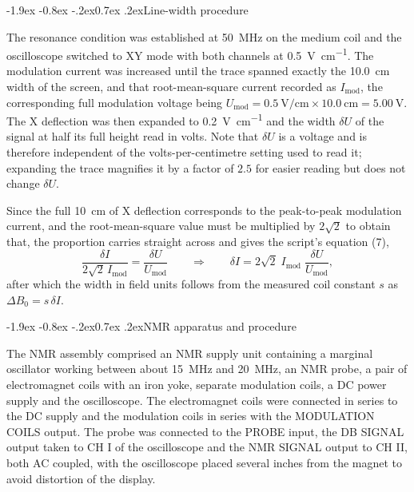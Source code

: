 \documentclass[11pt,a4paper]{article}
\makeatletter
\renewcommand\subsection{\@startsection{subsection}{2}{\z@}%
  {-1.9ex \@plus -0.8ex \@minus -.2ex}{0.7ex \@plus .2ex}{\normalfont\normalsize\bfseries}}
\makeatother
\begin{document}
\subsection{Line-width procedure}
\label{sec:width}

The resonance condition was established at \SI{50}{\mega\hertz} on the medium coil and the
oscilloscope switched to XY mode with both channels at \SI{0.5}{\volt\per\centi\metre}. The
modulation current was increased until the trace spanned exactly the \SI{10.0}{\centi\metre} width
of the screen, and that root-mean-square current recorded as $I_{\mathrm{mod}}$, the corresponding
full modulation voltage being
$U_{\mathrm{mod}} = \SI{0.5}{\volt\per\centi\metre}\times\SI{10.0}{\centi\metre} = \SI{5.00}{\volt}$.
The X deflection was then expanded to \SI{0.2}{\volt\per\centi\metre} and the width $\delta U$ of
the signal at half its full height read in volts. Note that $\delta U$ is a voltage and is
therefore independent of the volts-per-centimetre setting used to read it; expanding the trace
magnifies it by a factor of $2.5$ for easier reading but does not change $\delta U$.

Since the full \SI{10}{\centi\metre} of X deflection corresponds to the peak-to-peak modulation
current, and the root-mean-square value must be multiplied by $2\sqrt{2}$ to obtain that,
the proportion carries straight across and gives the script's equation (7),
\begin{equation}
\frac{\delta I}{2\sqrt{2}\,I_{\mathrm{mod}}} = \frac{\delta U}{U_{\mathrm{mod}}}
\qquad\Longrightarrow\qquad
\delta I = 2\sqrt{2}\;I_{\mathrm{mod}}\;\frac{\delta U}{U_{\mathrm{mod}}} ,
\label{eq:eq7}
\end{equation}
after which the width in field units follows from the measured coil constant $s$ as
$\Delta B_0 = s\,\delta I$.

\subsection{NMR apparatus and procedure}

The NMR assembly comprised an NMR supply unit containing a marginal oscillator working between
about \SI{15}{\mega\hertz} and \SI{20}{\mega\hertz}, an NMR probe, a pair of electromagnet coils
with an iron yoke, separate modulation coils, a DC power supply and the oscilloscope. The
electromagnet coils were connected in series to the DC supply and the modulation coils in series
with the MODULATION COILS output. The probe was connected to the PROBE input, the DB SIGNAL output
taken to CH I of the oscilloscope and the NMR SIGNAL output to CH II, both AC coupled, with the
oscilloscope placed several inches from the magnet to avoid distortion of the display.
\end{document}
